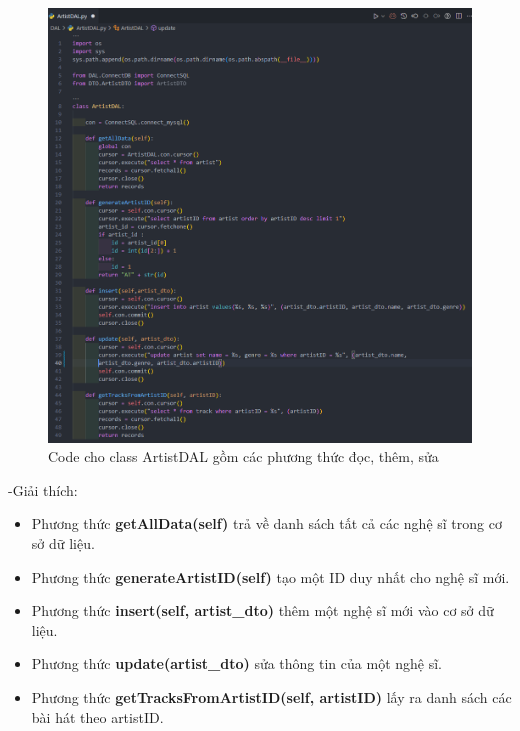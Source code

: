 \documentclass[a4paper]{article}
\begin{document}
\newpage
\begin{figure}[h]
	\centering
	\includegraphics[width=\textwidth]{artistDAL.png}
	\caption{Code cho class ArtistDAL gồm các phương thức đọc, thêm, sửa}
\end{figure}
\begin{flushleft}
	-Giải thích:
	\begin{itemize}
		\item Phương thức \textbf{getAllData(self)} trả về danh sách tất cả các nghệ sĩ trong cơ sở dữ liệu.

		\item Phương thức \textbf{generateArtistID(self)} tạo một ID duy nhất cho nghệ sĩ mới.

		\item Phương thức \textbf{insert(self, artist\_dto)} thêm một nghệ sĩ mới vào cơ sở dữ liệu.

		\item Phương thức \textbf{update(artist\_dto)} sửa thông tin của một nghệ sĩ.

		\item Phương thức \textbf{getTracksFromArtistID(self, artistID)} lấy ra danh sách các bài hát theo artistID.

	\end{itemize}
\end{flushleft}
\end{document}
